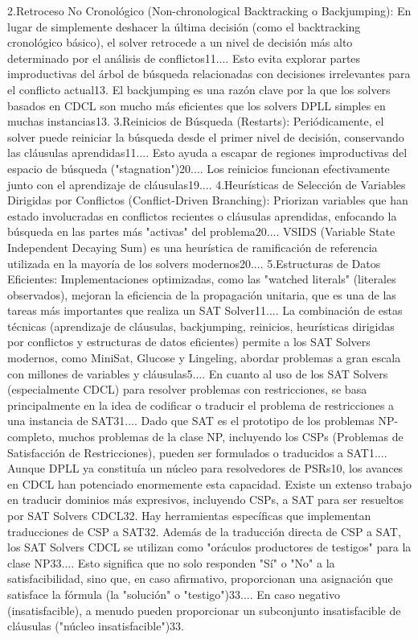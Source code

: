 2.Retroceso No Cronológico (Non-chronological Backtracking o Backjumping): En lugar de simplemente deshacer la última decisión (como el backtracking cronológico básico), el solver retrocede a un nivel de decisión más alto determinado por el análisis de conflictos11.... Esto evita explorar partes improductivas del árbol de búsqueda relacionadas con decisiones irrelevantes para el conflicto actual13. El backjumping es una razón clave por la que los solvers basados en CDCL son mucho más eficientes que los solvers DPLL simples en muchas instancias13.
3.Reinicios de Búsqueda (Restarts): Periódicamente, el solver puede reiniciar la búsqueda desde el primer nivel de decisión, conservando las cláusulas aprendidas11.... Esto ayuda a escapar de regiones improductivas del espacio de búsqueda ("stagnation")20.... Los reinicios funcionan efectivamente junto con el aprendizaje de cláusulas19....
4.Heurísticas de Selección de Variables Dirigidas por Conflictos (Conflict-Driven Branching): Priorizan variables que han estado involucradas en conflictos recientes o cláusulas aprendidas, enfocando la búsqueda en las partes más "activas" del problema20.... VSIDS (Variable State Independent Decaying Sum) es una heurística de ramificación de referencia utilizada en la mayoría de los solvers modernos20....
5.Estructuras de Datos Eficientes: Implementaciones optimizadas, como las "watched literals" (literales observados), mejoran la eficiencia de la propagación unitaria, que es una de las tareas más importantes que realiza un SAT Solver11....
La combinación de estas técnicas (aprendizaje de cláusulas, backjumping, reinicios, heurísticas dirigidas por conflictos y estructuras de datos eficientes) permite a los SAT Solvers modernos, como MiniSat, Glucose y Lingeling, abordar problemas a gran escala con millones de variables y cláusulas5....
En cuanto al uso de los SAT Solvers (especialmente CDCL) para resolver problemas con restricciones, se basa principalmente en la idea de codificar o traducir el problema de restricciones a una instancia de SAT31.... Dado que SAT es el prototipo de los problemas NP-completo, muchos problemas de la clase NP, incluyendo los CSPs (Problemas de Satisfacción de Restricciones), pueden ser formulados o traducidos a SAT1....
Aunque DPLL ya constituía un núcleo para resolvedores de PSRs10, los avances en CDCL han potenciado enormemente esta capacidad. Existe un extenso trabajo en traducir dominios más expresivos, incluyendo CSPs, a SAT para ser resueltos por SAT Solvers CDCL32. Hay herramientas específicas que implementan traducciones de CSP a SAT32.
Además de la traducción directa de CSP a SAT, los SAT Solvers CDCL se utilizan como "oráculos productores de testigos" para la clase NP33.... Esto significa que no solo responden "Sí" o "No" a la satisfacibilidad, sino que, en caso afirmativo, proporcionan una asignación que satisface la fórmula (la "solución" o "testigo")33.... En caso negativo (insatisfacible), a menudo pueden proporcionar un subconjunto insatisfacible de cláusulas ("núcleo insatisfacible")33.
